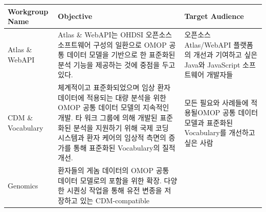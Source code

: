 \documentclass[11pt]{book}
\theoremstyle{definition}
\theoremstyle{definition}
\theoremstyle{definition}
\theoremstyle{remark}
\begin{document}
\begin{longtable}[]{@{}lll@{}}
\toprule
\begin{minipage}[b]{0.11\columnwidth}\raggedright\strut
Workgroup Name\strut
\end{minipage} & \begin{minipage}[b]{0.30\columnwidth}\raggedright\strut
Objective\strut
\end{minipage} & \begin{minipage}[b]{0.15\columnwidth}\raggedright\strut
Target Audience\strut
\end{minipage}\tabularnewline
\midrule
\endhead
\begin{minipage}[t]{0.11\columnwidth}\raggedright\strut
Atlas \& WebAPI\strut
\end{minipage} & \begin{minipage}[t]{0.30\columnwidth}\raggedright\strut
Atlas \& WebAPI는 OHDSI 오픈소스 소프트웨어 구성의 일환으로 OMOP 공통
데이터 모델을 기반으로 한 표준화된 분석 기능을 제공하는 것에 중점을 두고
있다.\strut
\end{minipage} & \begin{minipage}[t]{0.15\columnwidth}\raggedright\strut
오픈소스 Atlas/WebAPI 플랫폼의 개선과 기여하고 싶은 Java와 JavaScript
소프트웨어 개발자들\strut
\end{minipage}\tabularnewline
\begin{minipage}[t]{0.11\columnwidth}\raggedright\strut
CDM \& Vocabulary\strut
\end{minipage} & \begin{minipage}[t]{0.30\columnwidth}\raggedright\strut
체계적이고 표준화되었으며 임상 환자 데이터에 적용되는 대량 분석을 위한
OMOP 공통 데이터 모델의 지속적인 개발. 타 워크 그룹에 의해 개발된
표준화된 분석을 지원하기 위해 국제 코딩 시스템과 환자 케어의 임상적
측면의 증가를 통해 표준화된 Vocabulary의 질적 개선.\strut
\end{minipage} & \begin{minipage}[t]{0.15\columnwidth}\raggedright\strut
모든 필요와 사례들에 적용될OMOP 공통 데이터 모델과 표준화된 Vocabulary를
개선하고 싶은 사람\strut
\end{minipage}\tabularnewline
\begin{minipage}[t]{0.11\columnwidth}\raggedright\strut
Genomics\strut
\end{minipage} & \begin{minipage}[t]{0.30\columnwidth}\raggedright\strut
환자들의 게놈 데이터의 OMOP 공통 데이터 모델로의 포함을 위한 확장.
다양한 시퀀싱 작업을 통해 유전 변종을 저장하고 있는 CDM-compatible

\end{minipage}
\end{longtable}
\end{document}
